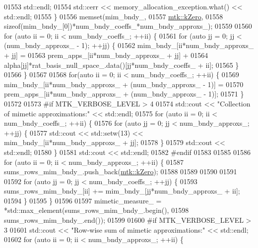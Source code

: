 \begin{DoxyCode}
{{01553       std::endl;
01554     std::cerr << memory\_allocation\_exception.what() << std::endl;
01555   \}
01556   memset(mim\_bndy\_,
01557          \hyperlink{group__c01-roots_ga59a451a5fae30d59649bcda274fea271}{mtk::kZero},
01558          \textcolor{keyword}{sizeof}(mim\_bndy\_[0])*num\_bndy\_coeffs\_*num\_bndy\_approxs\_);
01559 
01560   \textcolor{keywordflow}{for} (\textcolor{keyword}{auto} ii = 0; ii < num\_bndy\_coeffs\_; ++ii) \{
01561     \textcolor{keywordflow}{for} (\textcolor{keyword}{auto} jj = 0; jj < (num\_bndy\_approxs\_ - 1); ++jj) \{
01562       mim\_bndy\_[ii*num\_bndy\_approxs\_ + jj] =
01563         prem\_apps\_[ii*num\_bndy\_approxs\_ + jj] +
01564         alpha[jj]*rat\_basis\_null\_space\_.data()[jj*num\_bndy\_coeffs\_ + ii];
01565     \}
01566   \}
01567 
01568   \textcolor{keywordflow}{for}(\textcolor{keyword}{auto} ii = 0; ii < num\_bndy\_coeffs\_; ++ii) \{
01569     mim\_bndy\_[ii*num\_bndy\_approxs\_ + (num\_bndy\_approxs\_ - 1)] =
01570       prem\_apps\_[ii*num\_bndy\_approxs\_ + (num\_bndy\_approxs\_ - 1)];
01571   \}
01572 
01573 \textcolor{preprocessor}{  #if MTK\_VERBOSE\_LEVEL > 4}
01574   std::cout << \textcolor{stringliteral}{"Collection of mimetic approximations:"} << std::endl;
01575   \textcolor{keywordflow}{for} (\textcolor{keyword}{auto} ii = 0; ii < num\_bndy\_coeffs\_; ++ii) \{
01576     \textcolor{keywordflow}{for} (\textcolor{keyword}{auto} jj = 0; jj < num\_bndy\_approxs\_; ++jj) \{
01577       std::cout << std::setw(13) << mim\_bndy\_[ii*num\_bndy\_approxs\_ + jj];
01578     \}
01579     std::cout << std::endl;
01580   \}
01581   std::cout << std::endl;
01582 \textcolor{preprocessor}{  #endif}
01583 
01585 
01586   \textcolor{keywordflow}{for} (\textcolor{keyword}{auto} ii = 0; ii < num\_bndy\_approxs\_; ++ii) \{
01587     sums\_rows\_mim\_bndy\_.push\_back(\hyperlink{group__c01-roots_ga59a451a5fae30d59649bcda274fea271}{mtk::kZero});
01588 
01589 
01590 
01591 
01592     \textcolor{keywordflow}{for} (\textcolor{keyword}{auto} jj = 0; jj < num\_bndy\_coeffs\_; ++jj) \{
01593       sums\_rows\_mim\_bndy\_[ii] += mim\_bndy\_[jj*num\_bndy\_approxs\_ + ii];
01594     \}
01595   \}
01596 
01597     mimetic\_measure\_ = *std::max\_element(sums\_rows\_mim\_bndy\_.begin(),
01598                                       sums\_rows\_mim\_bndy\_.end());
01599 
01600 \textcolor{preprocessor}{  #if MTK\_VERBOSE\_LEVEL > 3}
01601   std::cout << \textcolor{stringliteral}{"Row-wise sum of mimetic approximations:"} << std::endl;
01602   \textcolor{keywordflow}{for} (\textcolor{keyword}{auto} ii = 0; ii < num\_bndy\_approxs\_; ++ii) \{
}}
\end{DoxyCode}
